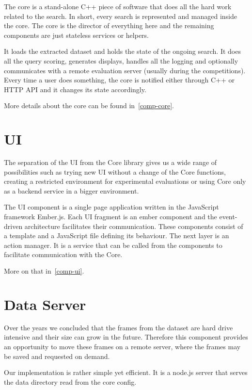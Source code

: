 The core is a stand-alone C++ piece of software that does all the hard work related to the search. In short, every search is represented and managed inside the core. The core is the director of everything here and the remaining components are just stateless services or helpers.

It loads the extracted dataset and holds the state of the ongoing search. It does all the query scoring, generates displays, handles all the logging and optionally communicates with a remote evaluation server (usually during the competitions). Every time a user does something, the core is notified either through C++ or HTTP API and it changes its state accordingly. 

More details about the core can be found in~\cref{comp-core}.

\section{UI}

The separation of the UI from the Core library gives us a wide range of possibilities such as trying new UI without a change of the Core functions, creating a restricted environment for experimental evaluations or using Core only as a backend service in a bigger environment. 

The UI component is a single page application written in the JavaScript framework Ember.js. Each UI fragment is an ember component and the event-driven architecture facilitates their communication. These components consist of a template and a JavaScript file defining its behaviour. The next layer is an action manager. It is a service that can be called from the components to facilitate communication with the Core. 

More on that in~\cref{comp-ui}.

\section{Data Server}

Over the years we concluded that the frames from the dataset are hard drive intensive and their size can grow in the future. Therefore this component provides an opportunity to move these frames on a remote server, where the frames may be saved and requested on demand. 

Our implementation is rather simple yet efficient. It is a node.js server that serves the data directory read from the core config.

